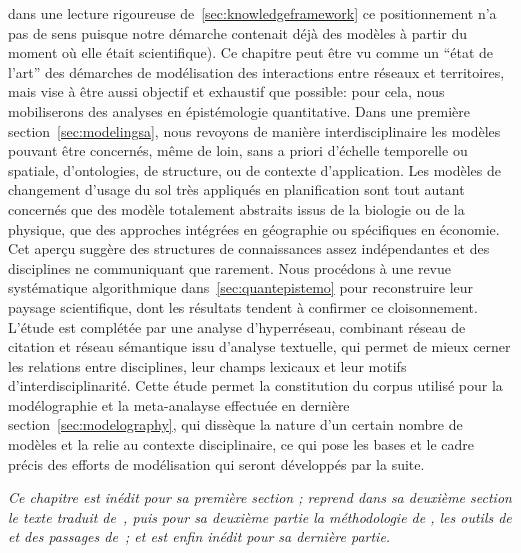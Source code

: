dans une lecture rigoureuse de~\ref{sec:knowledgeframework} ce positionnement n'a pas de sens puisque notre démarche contenait déjà des modèles à partir du moment où elle était scientifique). Ce chapitre peut être vu comme un ``état de l'art'' des démarches de modélisation des interactions entre réseaux et territoires, mais vise à être aussi objectif et exhaustif que possible: pour cela, nous mobiliserons des analyses en épistémologie quantitative. Dans une première section~\ref{sec:modelingsa}, nous revoyons de manière interdisciplinaire les modèles pouvant être concernés, même de loin, sans a priori d'échelle temporelle ou spatiale, d'ontologies, de structure, ou de contexte d'application. Les modèles de changement d'usage du sol très appliqués en planification sont tout autant concernés que des modèle totalement abstraits issus de la biologie ou de la physique, que des approches intégrées en géographie ou spécifiques en économie. Cet aperçu suggère des structures de connaissances assez indépendantes et des disciplines ne communiquant que rarement. Nous procédons à une revue systématique algorithmique dans~\ref{sec:quantepistemo} pour reconstruire leur paysage scientifique, dont les résultats tendent à confirmer ce cloisonnement. L'étude est complétée par une analyse d'hyperréseau, combinant réseau de citation et réseau sémantique issu d'analyse textuelle, qui permet de mieux cerner les relations entre disciplines, leur champs lexicaux et leur motifs d'interdisciplinarité. Cette étude permet la constitution du corpus utilisé pour la modélographie et la meta-analayse effectuée en dernière section~\ref{sec:modelography}, qui dissèque la nature d'un certain nombre de modèles et la relie au contexte disciplinaire, ce qui pose les bases et le cadre précis des efforts de modélisation qui seront développés par la suite.






\stars


\textit{Ce chapitre est inédit pour sa première section ; reprend dans sa deuxième section le texte traduit de~\cite{raimbault2015models}, puis pour sa deuxième partie la méthodologie de \cite{raimbault2016indirect}, les outils de \cite{bergeaud2017classifying} et des passages de~\cite{}; et est enfin inédit pour sa dernière partie.}








